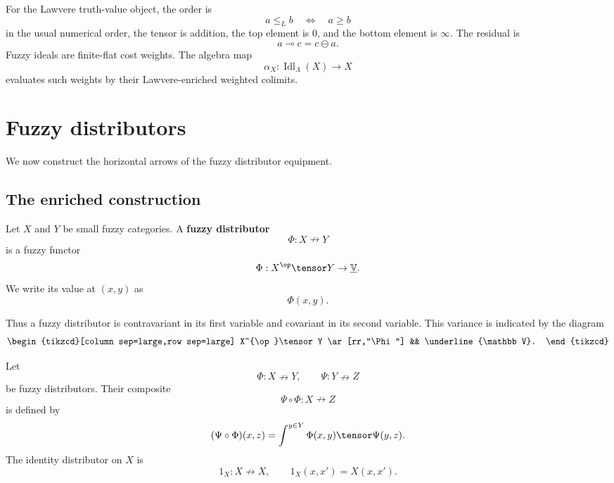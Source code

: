 \begin{example}
\label{ex:inherited-data-lawvere}
For the Lawvere truth-value object, the order is
\[
    a\leq_L b
    \quad\Longleftrightarrow\quad
    a\geq b
\]
in the usual numerical order, the tensor is addition, the top element is \(0\),
and the bottom element is \(\infty\). The residual is
\[
    a\multimap c=c\ominus a.
\]
Fuzzy ideals are finite-flat cost weights. The algebra map
\[
    \alpha_X:\operatorname{Idl}_\Lambda(X)\to X
\]
evaluates such weights by their Lawvere-enriched weighted colimits.
\end{example}

\section{Fuzzy distributors}
\label{sec:fuzzy-distributors}

We now construct the horizontal arrows of the fuzzy distributor equipment.

\subsection{The enriched construction}
\label{subsec:fuzzy-distributors-enriched}

\begin{definition}
\label{def:fuzzy-distributor}
Let \(X\) and \(Y\) be small fuzzy categories. A \textbf{fuzzy distributor}
\[
    \Phi:X\nrightarrow Y
\]
is a fuzzy functor
\[
    \Phi:X^{\op}\tensor Y\to \underline{\mathbb V}.
\]
We write its value at \((x,y)\) as
\[
    \Phi(x,y).
\]
\end{definition}

Thus a fuzzy distributor is contravariant in its first variable and covariant in
its second variable. This variance is indicated by the diagram
\[
\begin{tikzcd}[column sep=large,row sep=large]
X^{\op}\tensor Y
    \ar[rr,"\Phi"]
&&
\underline{\mathbb V}.
\end{tikzcd}
\]

\begin{definition}
\label{def:fuzzy-distributor-composition}
Let
\[
    \Phi:X\nrightarrow Y,
    \qquad
    \Psi:Y\nrightarrow Z
\]
be fuzzy distributors. Their composite
\[
    \Psi\circ\Phi:X\nrightarrow Z
\]
is defined by
\[
    (\Psi\circ\Phi)(x,z)
    =
    \int^{y\in Y}
    \Phi(x,y)\tensor \Psi(y,z).
\]
The identity distributor on \(X\) is
\[
    1_X:X\nrightarrow X,
    \qquad
    1_X(x,x')=X(x,x').
\]
\end{definition}

